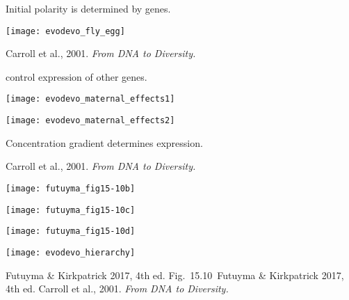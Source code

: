 \documentclass[t]{beamer}
\newcommand{\futuyma}[1]{%
	\ifthenelse{\isempty{#1}}%
	{Futuyma \& Kirkpatrick 2017, 4th ed.}%
	{Fig.~#1~Futuyma \& Kirkpatrick 2017, 4th ed.}%
}
\newcommand{\backskip}{\vspace{-0.5\baselineskip}}
\begin{document}

\begin{frame}{Initial polarity is determined by  genes.}

\backskip


\centering

\texttt{[image: evodevo\_fly\_egg]}

\tinyfill Carroll et al., 2001. \textit{From DNA to Diversity.}


\end{frame}


\begin{frame}{ control expression of other genes.}

\vspace{-\baselineskip}

\begin{multicols}{2}

\texttt{[image: evodevo\_maternal\_effects1]}

\columnbreak

\texttt{[image: evodevo\_maternal\_effects2]}

\end{multicols}

\hangpara Concentration gradient determines expression.

\tinyfill Carroll et al., 2001. \textit{From DNA to Diversity.}


\end{frame}


\begin{frame}

\begin{multicols}{2}

\centering

\texttt{[image: futuyma\_fig15-10b]}

\texttt{[image: futuyma\_fig15-10c]}

\texttt{[image: futuyma\_fig15-10d]}

\columnbreak

\texttt{[image: evodevo\_hierarchy]}
\end{multicols}

\vfilll

\tiny \futuyma{15.10} \hfill Carroll et al., 2001. \textit{From DNA to Diversity.}


\end{frame}
\end{document}
